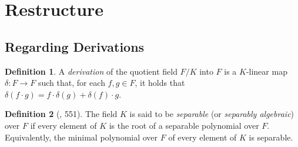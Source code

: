 \documentclass{article}
\theoremstyle{definition}
\newtheorem{definition}{Definition}
\newcommand{\6}{\mathbf}
\newcommand{\7}{\mathcal}
\begin{document}










\section{Restructure}
\subsection{Regarding Derivations}

\medskip

\begin{definition}
    A \textit{derivation} of the quotient field $F/K$ into $F$ is a $K$-linear map $\delta : F \rightarrow F$ such that, for each $f,g \in F$, it holds that $\delta(f \cdot g) = f \cdot \delta(g) + \delta(f) \cdot g$.
\end{definition}


\begin{definition} [\cite{Dummit04}, 551]
    The field $K$ is said to be \textit{separable} (or \textit{separably algebraic}) over $F$ if every element of $K$ is the root of a separable polynomial over $F$. Equivalently, the minimal polynomial over $F$ of every element of $K$ is separable.
\end{definition}
\end{document}
